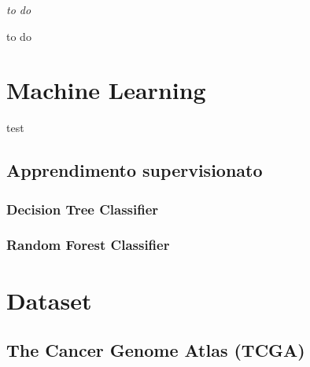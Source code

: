 \documentclass[12pt,italian]{report}
\begin{document}
	
	\frontespizio
	\beforepreface
	
	
	{\raggedleft \large \sl to do\\
		
	}
	
	
	
	
	
	
	
	to do
	
	
	\afterpreface
	
	
	\chapter{Machine Learning}
	test
	\section{Apprendimento supervisionato}
	\subsection{Decision Tree Classifier}
	\subsection{Random Forest Classifier}
	
	\chapter{Dataset}
	\section{The Cancer Genome Atlas (TCGA)}
	
\end{document}
